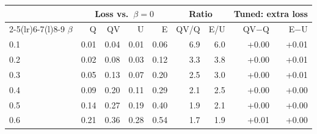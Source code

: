 \begin{tabular}{@{}lrrrrrrrr@{}}
\toprule
 & \multicolumn{4}{c}{Loss vs.\ $\beta=0$} & \multicolumn{2}{c}{Ratio} & \multicolumn{2}{c}{Tuned: extra loss} \\
\cmidrule(lr){2-5}\cmidrule(lr){6-7}\cmidrule(l){8-9}
$\beta$ & Q & QV & U & E & QV/Q & E/U & QV$-$Q & E$-$U \\
\midrule
0.1 & 0.01 & 0.04 & 0.01 & 0.06 & 6.9 & 6.0 & +0.00 & +0.01 \\
0.2 & 0.02 & 0.08 & 0.03 & 0.12 & 3.3 & 3.8 & +0.00 & +0.01 \\
0.3 & 0.05 & 0.13 & 0.07 & 0.20 & 2.5 & 3.0 & +0.00 & +0.01 \\
0.4 & 0.09 & 0.20 & 0.11 & 0.29 & 2.1 & 2.5 & +0.00 & +0.00 \\
0.5 & 0.14 & 0.27 & 0.19 & 0.40 & 1.9 & 2.1 & +0.00 & +0.00 \\
0.6 & 0.21 & 0.36 & 0.28 & 0.54 & 1.7 & 1.9 & +0.01 & +0.00 \\
\bottomrule
\end{tabular}